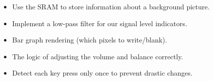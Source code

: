\begin{itemize}
\item Use the SRAM to store information about a background picture.
\item Implement a low-pass filter for our signal level indicators. 
\item Bar graph rendering (which pixels to write/blank).
\item The logic of adjusting the volume and balance correctly.
\item Detect each key press only once to prevent drastic changes.
\end{itemize}